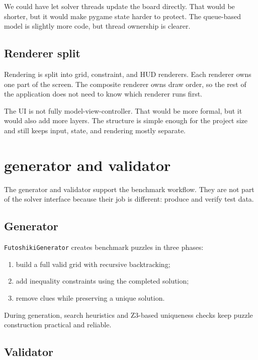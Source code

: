 \documentclass[11pt]{article}
\begin{document}
We could have let solver threads update the board directly. That would be
shorter, but it would make pygame state harder to protect. The queue-based
model is slightly more code, but thread ownership is clearer.

\subsection{Renderer split}

Rendering is split into grid, constraint, and HUD renderers. Each renderer owns
one part of the screen. The composite renderer owns draw order, so the rest of
the application does not need to know which renderer runs first.

The UI is not fully model-view-controller. That would be more formal, but it
would also add more layers. The structure is simple enough for the project size
and still keeps input, state, and rendering mostly separate.

\section{generator and validator}

The generator and validator support the benchmark workflow. They are not part
of the solver interface because their job is different: produce and verify test
data.

\subsection{Generator}

\texttt{FutoshikiGenerator} creates benchmark puzzles in three phases:

\begin{enumerate}
  \item build a full valid grid with recursive backtracking;
  \item add inequality constraints using the completed solution;
  \item remove clues while preserving a unique solution.
\end{enumerate}

During generation, search heuristics and Z3-based uniqueness checks keep puzzle
construction practical and reliable.

\subsection{Validator}
\end{document}
